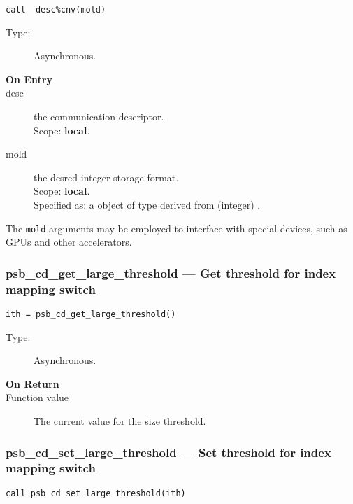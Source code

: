 \begin{verbatim}
call  desc%cnv(mold)
\end{verbatim}

\begin{description}
\item[Type:] Asynchronous.
\item[\bf On Entry]
\item[desc] the communication descriptor.\\
Scope: {\bf local}.\\
\item[mold] the desred integer storage format.\\
Scope: {\bf local}.\\
Specified as: a object of type derived from (integer) \vbasedata.
\end{description}
The \verb|mold|  arguments may be
employed to interface with special devices, such as GPUs and other
accelerators. 



\subsubsection*{psb\_cd\_get\_large\_threshold --- Get threshold for
  index mapping switch}

\begin{verbatim}
ith = psb_cd_get_large_threshold()
\end{verbatim}

\begin{description}
\item[Type:] Asynchronous.
\item[\bf On Return]
\item[Function value] The current value for the size threshold. 

\end{description}



\subsubsection*{psb\_cd\_set\_large\_threshold --- Set threshold for
  index mapping switch}

\begin{verbatim}
call psb_cd_set_large_threshold(ith)
\end{verbatim}

